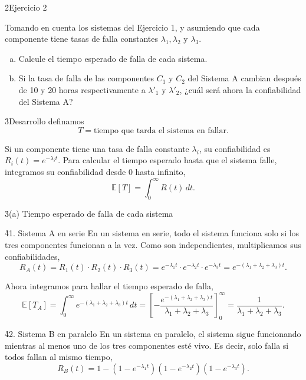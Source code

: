 \documentclass[main.tex]{subfiles}%
\begin{document}
\h2{Ejercicio 2}

Tomando en cuenta los sistemas del Ejercicio 1, y asumiendo que cada componente tiene tasas de falla constantes $\lambda_1, \lambda_2$ y $\lambda_3$.
\begin{enumerate}[(a)]
    \item Calcule el tiempo esperado de falla de cada sistema.
    \item Si la tasa de falla de las componentes $C_1$ y $C_2$ del Sistema A cambian después de 10 y 20 horas respectivamente a $\lambda'_1$ y $\lambda'_2$, ¿cuál será ahora la confiabilidad del Sistema A?
\end{enumerate}

\vspace{3mm}
\h3{Desarrollo}
definamos
 $$T = \text{tiempo que tarda el sistema en fallar.}$$ 

Si un componente tiene una tasa de falla constante $\lambda_i$, su confiabilidad es $R_i(t) = e^{-\lambda_i t}$. Para calcular el tiempo esperado hasta que el sistema falle, integramos su confiabilidad desde $0$ hasta infinito,
\begin{equation*}
    \mathbb{E}[T] = \int_0^\infty R(t)\,dt.
\end{equation*}

\vspace{3mm}
\h3{(a) Tiempo esperado de falla de cada sistema}

\h4{1. Sistema A en serie}
En un sistema en serie, todo el sistema funciona solo si los tres componentes funcionan a la vez. Como son independientes, multiplicamos sus confiabilidades,
\begin{equation*}
    R_A(t) = R_1(t) \cdot R_2(t) \cdot R_3(t) = e^{-\lambda_1 t} \cdot e^{-\lambda_2 t} \cdot e^{-\lambda_3 t} = e^{-(\lambda_1 + \lambda_2 + \lambda_3)t}.
\end{equation*}

Ahora integramos para hallar el tiempo esperado de falla,
\begin{equation*}
    \mathbb{E}[T_A] = \int_0^\infty e^{-(\lambda_1 + \lambda_2 + \lambda_3)t}\,dt = \left[ -\frac{e^{-(\lambda_1 + \lambda_2 + \lambda_3)t}}{\lambda_1 + \lambda_2 + \lambda_3} \right]_0^\infty = \frac{1}{\lambda_1 + \lambda_2 + \lambda_3}.
\end{equation*}

\vspace{3mm}
\h4{2. Sistema B en paralelo}
En un sistema en paralelo, el sistema sigue funcionando mientras al menos uno de los tres componentes esté vivo. Es decir, solo falla si todos fallan al mismo tiempo,
\begin{equation*}
    R_B(t) = 1 - (1 - e^{-\lambda_1 t})(1 - e^{-\lambda_2 t})(1 - e^{-\lambda_3 t}).
\end{equation*}
\end{document}

